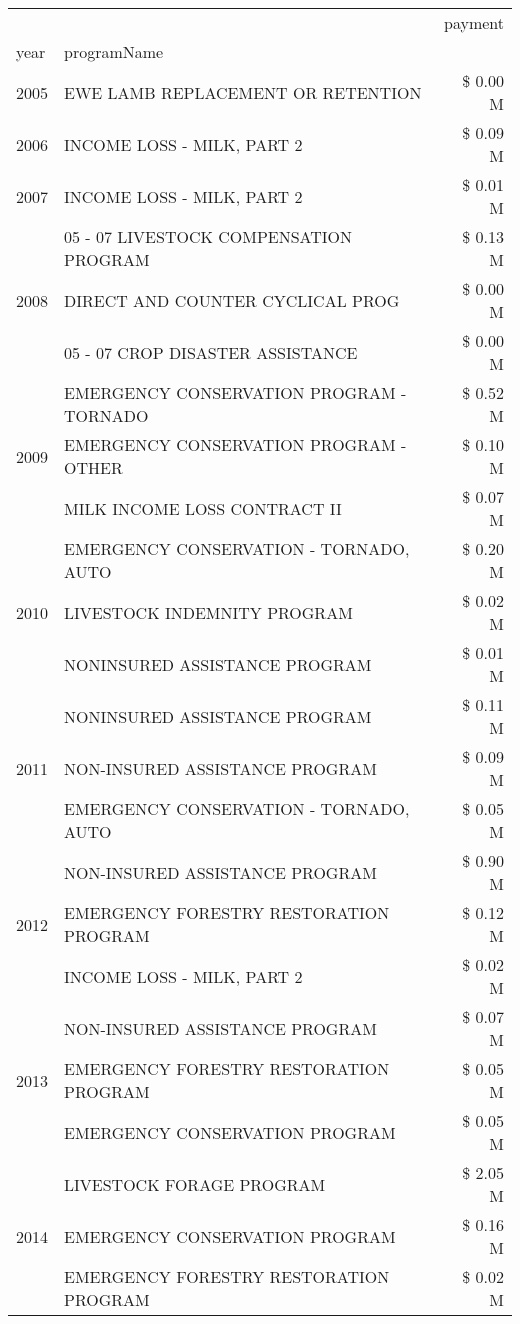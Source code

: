 \begin{tabular}{llr}
\toprule
 &  & payment \\
year & programName &  \\
\midrule
2005 & EWE LAMB REPLACEMENT OR RETENTION & \$ 0.00 M \\
\cline{1-3}
2006 & INCOME LOSS - MILK, PART 2 & \$ 0.09 M \\
\cline{1-3}
2007 & INCOME LOSS - MILK, PART 2 & \$ 0.01 M \\
\cline{1-3}
\multirow[t]{3}{*}{2008} & 05 - 07 LIVESTOCK COMPENSATION PROGRAM & \$ 0.13 M \\
 & DIRECT AND COUNTER CYCLICAL PROG & \$ 0.00 M \\
 & 05 - 07 CROP DISASTER ASSISTANCE & \$ 0.00 M \\
\cline{1-3}
\multirow[t]{3}{*}{2009} & EMERGENCY CONSERVATION PROGRAM - TORNADO & \$ 0.52 M \\
 & EMERGENCY CONSERVATION PROGRAM - OTHER & \$ 0.10 M \\
 & MILK INCOME LOSS CONTRACT II & \$ 0.07 M \\
\cline{1-3}
\multirow[t]{3}{*}{2010} & EMERGENCY CONSERVATION - TORNADO, AUTO & \$ 0.20 M \\
 & LIVESTOCK INDEMNITY PROGRAM & \$ 0.02 M \\
 & NONINSURED ASSISTANCE PROGRAM & \$ 0.01 M \\
\cline{1-3}
\multirow[t]{3}{*}{2011} & NONINSURED ASSISTANCE PROGRAM & \$ 0.11 M \\
 & NON-INSURED ASSISTANCE PROGRAM & \$ 0.09 M \\
 & EMERGENCY CONSERVATION - TORNADO, AUTO & \$ 0.05 M \\
\cline{1-3}
\multirow[t]{3}{*}{2012} & NON-INSURED ASSISTANCE PROGRAM & \$ 0.90 M \\
 & EMERGENCY FORESTRY RESTORATION PROGRAM & \$ 0.12 M \\
 & INCOME LOSS - MILK, PART 2 & \$ 0.02 M \\
\cline{1-3}
\multirow[t]{3}{*}{2013} & NON-INSURED ASSISTANCE PROGRAM & \$ 0.07 M \\
 & EMERGENCY FORESTRY RESTORATION PROGRAM & \$ 0.05 M \\
 & EMERGENCY CONSERVATION PROGRAM & \$ 0.05 M \\
\cline{1-3}
\multirow[t]{3}{*}{2014} & LIVESTOCK FORAGE PROGRAM & \$ 2.05 M \\
 & EMERGENCY CONSERVATION PROGRAM & \$ 0.16 M \\
 & EMERGENCY FORESTRY RESTORATION PROGRAM & \$ 0.02 M \\

\end{tabular}

